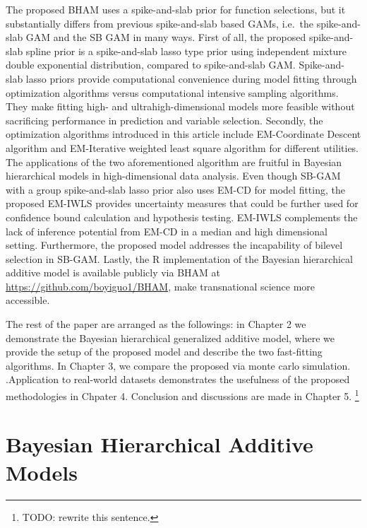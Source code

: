 \documentclass[AMA,STIX1COL,]{WileyNJD-v2}
\begin{document}
The proposed BHAM uses a spike-and-slab prior for function selections,
but it substantially differs from previous spike-and-slab based GAMs,
i.e.~the spike-and-slab GAM \citep{Scheipl2012} and the SB GAM
\citep{Bai2021} in many ways. First of all, the proposed spike-and-slab
spline prior is a spike-and-slab lasso type prior using independent
mixture double exponential distribution, compared to spike-and-slab GAM.
Spike-and-slab lasso priors provide computational convenience during
model fitting through optimization algorithms versus computational
intensive sampling algorithms. They make fitting high- and
ultrahigh-dimensional models more feasible without sacrificing
performance in prediction and variable selection. Secondly, the
optimization algorithms introduced in this article include EM-Coordinate
Descent algorithm and EM-Iterative weighted least square algorithm for
different utilities. The applications of the two aforementioned
algorithm are fruitful in Bayesian hierarchical models in
high-dimensional data analysis.
\citep{Yi2012, Rockova2014a, Rockova2018} Even though SB-GAM with a
group spike-and-slab lasso prior also uses EM-CD for model fitting, the
proposed EM-IWLS provides uncertainty measures that could be further
used for confidence bound calculation and hypothesis testing. EM-IWLS
complements the lack of inference potential from EM-CD in a median and
high dimensional setting. Furthermore, the proposed model addresses the
incapability of bilevel selection in SB-GAM. Lastly, the R
implementation of the Bayesian hierarchical additive model is available
publicly via BHAM at \url{https://github.com/boyiguo1/BHAM}, make
transnational science more accessible.

The rest of the paper are arranged as the followings: in Chapter 2 we
demonstrate the Bayesian hierarchical generalized additive model, where
we provide the setup of the proposed model and describe the two
fast-fitting algorithms. In Chapter 3, we compare the proposed via monte
carlo simulation. .Application to real-world datasets demonstrates the
usefulness of the proposed methodologies in Chpater 4. Conclusion and
discussions are made in Chapter 5. \footnote{TODO: rewrite this
  sentence.}

\hypertarget{bayesian-hierarchical-additive-models}{%
\section{Bayesian Hierarchical Additive
Models}\label{bayesian-hierarchical-additive-models}}
\end{document}
